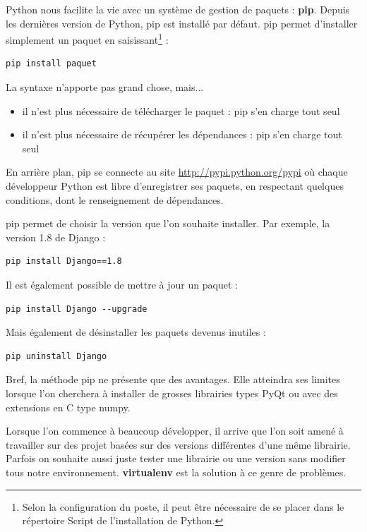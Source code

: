 \documentclass[12pt, a4paper]{article}
\begin{document}
Python nous facilite la vie avec un système de gestion de paquets : \textbf{pip}. Depuis les dernières version de Python, pip est installé par défaut. pip permet d'installer simplement un paquet en saisissant\footnote{Selon la configuration du poste, il peut être nécessaire de se placer dans le répertoire Script de l'installation de Python.} :
\begin{lstlisting}
pip install paquet
\end{lstlisting}

La syntaxe n'apporte pas grand chose, mais...
\begin{itemize}
	\item il n'est plus nécessaire de télécharger le paquet : pip s'en charge tout seul
	\item il n'est plus nécessaire de récupérer les dépendances : pip s'en charge tout seul
\end{itemize}

En arrière plan, pip se connecte au site \url{http://pypi.python.org/pypi} où chaque développeur Python est libre d'enregistrer ses paquets, en respectant quelques conditions, dont le renseignement de dépendances.

pip permet de choisir la version que l'on souhaite installer. Par exemple, la version 1.8 de Django :
\begin{lstlisting}
pip install Django==1.8
\end{lstlisting}

Il est également possible de mettre à jour un paquet :
\begin{lstlisting}
pip install Django --upgrade
\end{lstlisting}

Mais également de désinstaller les paquets devenus inutiles :
\begin{lstlisting}
pip uninstall Django
\end{lstlisting}
	
Bref, la méthode pip ne présente que des avantages. Elle atteindra ses limites lorsque l'on cherchera à installer de grosses librairies types PyQt ou avec des extensions en C type numpy.

\vspace{2em}

Lorsque l'on commence à beaucoup développer, il arrive que l'on soit amené à travailler sur des projet basées sur des versions différentes d'une même librairie. Parfois on souhaite aussi juste tester une librairie ou une version sans modifier tous notre environnement. \textbf{virtualenv} est la solution à ce genre de problèmes.
\end{document}

